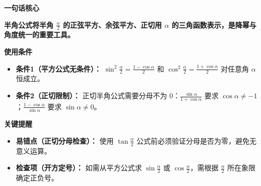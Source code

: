\begin{summarybox}

	\textbf{\textcolor{CSummary}{一句话核心}}

	\textbf{半角公式将半角 $\frac{\alpha}{2}$ 的正弦平方、余弦平方、正切用 $\alpha$ 的三角函数表示，是降幂与角度统一的重要工具。}

	\medskip
	\textbf{\textcolor{CSummary}{使用条件}}
	\begin{itemize}[leftmargin=*, itemsep=0.5em, topsep=0.4em]
		\item \textbf{条件1（平方公式无条件）：} $\sin^2\frac{\alpha}{2} = \frac{1-\cos\alpha}{2}$ 和 $\cos^2\frac{\alpha}{2} = \frac{1+\cos\alpha}{2}$ 对任意角 $\alpha$ 恒成立。
		\item \textbf{条件2（正切限制）：} 正切半角公式需要分母不为 $0$：$\frac{\sin\alpha}{1+\cos\alpha}$ 要求 $\cos\alpha \neq -1$；$\frac{1-\cos\alpha}{\sin\alpha}$ 要求 $\sin\alpha \neq 0$。
	\end{itemize}

	\medskip
	\textbf{\textcolor{CSummary}{关键提醒}}
	\begin{itemize}[leftmargin=*, itemsep=0.5em, topsep=0.4em]
		\item \textbf{易错点（正切分母检查）：} 使用 $\tan\frac{\alpha}{2}$ 公式前必须验证分母是否为零，避免无意义运算。
		\item \textbf{检查项（开方定号）：} 如需从平方公式求 $\sin\frac{\alpha}{2}$ 或 $\cos\frac{\alpha}{2}$，需根据 $\frac{\alpha}{2}$ 所在象限确定正负号。
	\end{itemize}
\end{summarybox}
